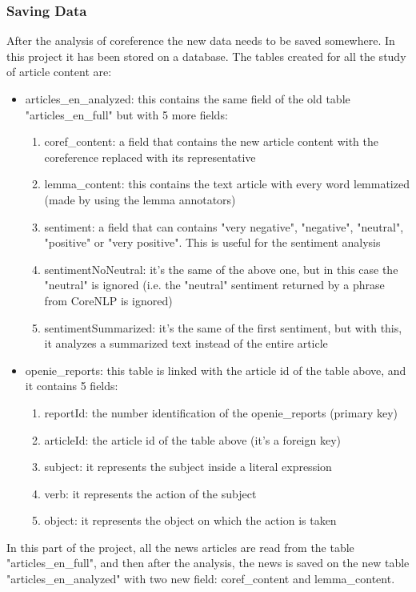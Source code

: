 \subsubsection{Saving Data}
After the analysis of coreference the new data needs to be saved somewhere. In this project it has been stored on a database. The tables created for all the study of article content are:
\begin{itemize}
	\item articles\_en\_analyzed: this contains the same field of the old table "articles\_en\_full" but with 5 more fields:
	\begin{enumerate}
		\item coref\_content: a field that contains the new article content with the coreference replaced with its representative
		\item lemma\_content: this contains the text article with every word lemmatized (made by using the lemma annotators)
		\item sentiment: a field that can contains "very negative", "negative", "neutral", "positive" or "very positive". This is useful for the sentiment analysis
		\item sentimentNoNeutral: it's the same of the above one, but in this case the "neutral" is ignored (i.e. the "neutral" sentiment returned by a phrase from CoreNLP is ignored)
		\item sentimentSummarized: it's the same of the first sentiment, but with this, it analyzes a summarized text instead of the entire article
	\end{enumerate}
	\item openie\_reports: this table is linked with the article id of the table above, and it contains 5 fields:
	\begin{enumerate}
		\item reportId: the number identification of the openie\_reports (primary key)
		\item articleId: the article id of the table above (it's a foreign key)
		\item subject: it represents the subject inside a literal expression
		\item verb: it represents the action of the subject
		\item object: it represents the object on which the action is taken
	\end{enumerate}
\end{itemize}
In this part of the project, all the news articles are read from the table "articles\_en\_full", and then after the analysis, the news is saved on the new table "articles\_en\_analyzed" with two new field: coref\_content and lemma\_content.

